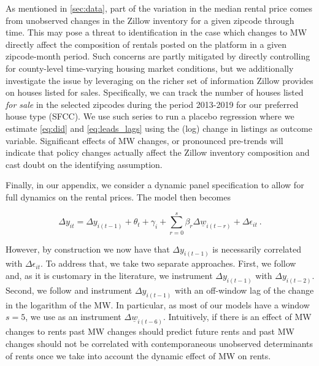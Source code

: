 As mentioned in \autoref{sec:data}, part of the variation in the median rental price comes from 
unobserved changes in the Zillow inventory for a given zipcode through time. This may pose a threat 
to identification in the case which changes to MW directly affect the composition of rentals posted 
on the platform in a given zipcode-month period. Such concerns are partly mitigated by directly 
controlling for county-level time-varying housing market conditions, but we additionally investigate 
the issue by leveraging on the richer set of information Zillow provides on houses listed for sales. 
Specifically, we can track the number of houses listed \textit{for sale} in the selected zipcodes 
during the period 2013-2019 for our preferred house type (SFCC). We use such series to run a placebo 
regression where we estimate \autoref{eq:did} and \autoref{eq:leads_lags} using the (log) change in 
listings as outcome variable.  Significant effects of MW changes, or pronounced pre-trends will 
indicate that policy changes actually affect the Zillow inventory composition and cast doubt on the 
identifying assumption.

Finally, in our appendix, we consider a dynamic panel specification to allow for full dynamics on 
the rental prices. The model then becomes

\begin{equation}\label{eq:ab_panel}
        \Delta y_{it} = \Delta y_{i(t-1)} + \theta_t + \gamma_i 
        		+ \sum_{r=0}^{s}\beta_r \Delta \underline{w}_{i(t-r)} 
        		+ \Delta \epsilon_{it} \ .
\end{equation}

However, by construction we now have that $\Delta y_{i(t-1)}$ is necessarily correlated with 
$\Delta \epsilon_{it}$. To address that, we take two separate approaches. First, we follow 
\textcite{ArellanoBond1991} and, as it is customary in the literature, we instrument $\Delta 
y_{i(t-1)}$ with $\Delta y_{i(t-2)}$. Second, we follow \textcite{MeerWest2016} and instrument 
$\Delta y_{i(t-1)}$ with an off-window lag of the change in the logarithm of the MW. In particular, 
as most of our models have a window $s=5$, we use as an instrument $\Delta \underline{w}_{i(t-6)}$. 
Intuitively, if there is an effect of MW changes to rents past MW changes should predict future 
rents and past MW changes should not be correlated with contemporaneous unobserved determinants 
of rents once we take into account the dynamic effect of MW on rents. 



